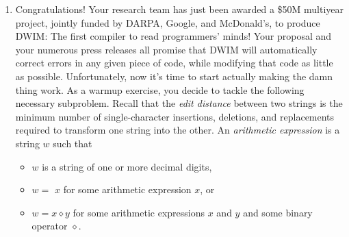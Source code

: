 \begin{enumerate}[label=\arabic*.,ref=\thechapter.\arabic*,leftmargin=*,align=left,widest*=99,itemsep=1.5ex plus 0.5ex,resume]
\begin{enumerate}
\item Describe and analyze an algorithm to compute the length of a shortest balanced supersequence of a given string of parentheses and brackets.
\item Describe and analyze an algorithm to compute the minimum edit distance from a given string of parentheses and brackets to a balanced string of parentheses and brackets.
\item {} Describe and analyze an algorithm to compute the longest common balanced subsequence of two given strings of parentheses and brackets.
\item {} Describe and analyze an algorithm to compute the longest palindromic balanced subsequence of a given string of parentheses and brackets.
\item {} Describe and analyze an algorithm to compute the longest common palindromic balanced subsequence (whew!)
of two given strings of parentheses and brackets.
\end{enumerate}
For each problem, your input is an array $w[1\,..\,n]$, where $w[i] \in \{$\Str{(}$,$ \Str{)}$,$ \Str{[}$,$ \Str{]}$\}$ for every index $i$.
(You may prefer to use different symbols instead of parentheses and brackets—for example, $,$ $,$ $,$  or $\triangleleft,\triangleright,\blacktriangleleft,\blacktriangleright$—but please tell your grader what symbols you’re using!)
\item {} Congratulations!
Your research team has just been awarded a \$50M multiyear project, jointly funded by DARPA, Google, and McDonald’s, to produce DWIM: The first compiler to read programmers’ minds!
Your proposal and your numerous press releases all promise that DWIM will automatically correct errors in any given piece of code, while modifying that code as little as possible.
Unfortunately, now it’s time to start actually making the damn thing work.
As a warmup exercise, you decide to tackle the following necessary subproblem.
Recall that the \textit{edit distance} between two strings is the minimum number of single-character insertions, deletions, and replacements required to transform one string into the other.
An \textit{arithmetic expression} is a string $w$ such that
\begin{itemize}
\item $w$ is a string of one or more decimal digits,
\item $w=$ \Str{(}$x$\Str{)} for some arithmetic expression $x$, or
\item $w=x\diamond y$ for some arithmetic expressions $x$ and $y$ and some binary operator $\diamond$.

\end{itemize}
\end{enumerate}

